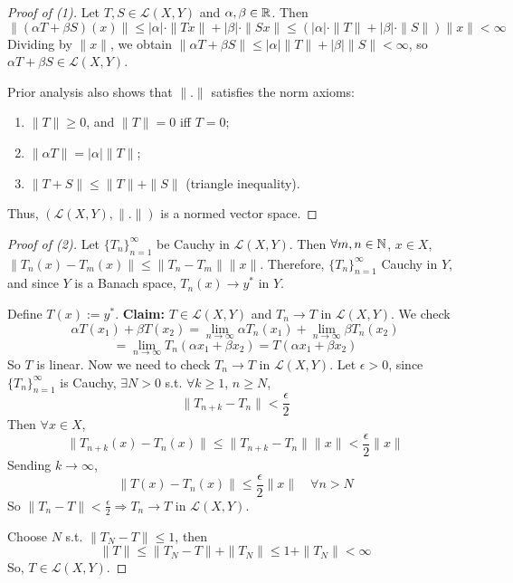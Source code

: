 \begin{proof}[Proof of (1)]
    Let $T, S \in \mathcal{L}(X, Y)$ and $\alpha, \beta \in \mathbb{R}$. Then
        \[
            \| (\alpha T + \beta S)(x) \| \leq |\alpha| \cdot \| Tx \| + |\beta| \cdot \| Sx \|   
            \leq \left( |\alpha| \cdot \| T \| + |\beta| \cdot \| S \| \right) \| x \| < \infty
        \]
        Dividing by $\| x \|$, we obtain 
        $\| \alpha T + \beta S \| \leq |\alpha| \| T \| + |\beta| \| S \| < \infty$,
        so $\alpha T + \beta S \in \mathcal{L}(X, Y)$.

        Prior analysis also shows that $\| . \|$ satisfies the norm axioms:
        \begin{enumerate}
            \item $\| T \| \geq 0$, and $\| T \| = 0$ iff $T = 0$;
            \item $\| \alpha T \| = |\alpha| \| T \|$;
            \item $\| T + S \| \leq \| T \| + \| S \|$ \quad (triangle inequality).
        \end{enumerate}

        Thus, $(\mathcal{L}(X, Y), \| . \|)$ is a normed vector space.
\end{proof}

\begin{proof}[Proof of (2)]
    Let $\{T_{n}\}_{n=1}^{\infty} $ be Cauchy in $\mathcal{L}(X, Y)$. Then $\forall m, n \in \mathbb{N}$, $x \in X$,
    $\| T_n(x) - T_m(x) \| \leq \| T_n - T_m \| \| x \|$. Therefore, $\{T_{n}\}_{n=1}^{\infty} $ Cauchy in $Y$,
    and since $Y$ is a Banach space, $T_n(x) \to y^*$ in $Y$.
    
    Define $T(x) := y^*$.
    \newline\noindent \textbf{Claim:} $T \in \mathcal{L}(X, Y)$ and $T_n \to T$ in $\mathcal{L}(X, Y)$.
    \newline \noindent We check \[\alpha T(x_1) + \beta T(x_2) = \lim_{n \to \infty} \alpha T_n(x_1) +
    \lim_{n \to \infty} \beta T_n(x_2)\]
    \[
        = \lim_{n \to \infty} T_n(\alpha x_1 + \beta x_2) = T(\alpha x_1 + \beta x_2)
    \]   
    So $T$ is linear. Now we need to check $T_n \to T$ in $\mathcal{L}(X, Y)$. Let $\epsilon > 0$, since
    $\{T_{n}\}_{n=1}^{\infty} $ is Cauchy, $\exists N > 0$ s.t. $\forall k \geq 1$, $n \geq N$, 
    \[
        \| T_{n + k} - T_n \| < \frac{\epsilon}{2} 
    \]          
    Then $\forall x \in X$,
    \[
        \| T_{n + k}(x) - T_n(x) \| \leq \| T_{n + k} - T_n \| \| x \| < \frac{\epsilon}{2} \| x \|   
    \]  
    Sending $k \to \infty$,
    \[
        \| T(x) - T_n(x) \| \leq \frac{\epsilon}{2} \| x \| \quad \forall n > N 
    \]  
    So $\| T_n - T \| < \frac{\epsilon}{2} \Rightarrow T_n \to T$ in $\mathcal{L}(X, Y)$.  

    Choose $N$ s.t. $\| T_N - T \| \leq 1 $, then \[
    \| T \| \leq \| T_N - T \| + \| T_N \| \leq 1 + \| T_N \| < \infty 
    \]
    So, $T \in \mathcal{L}(X, Y)$.  
\end{proof}

